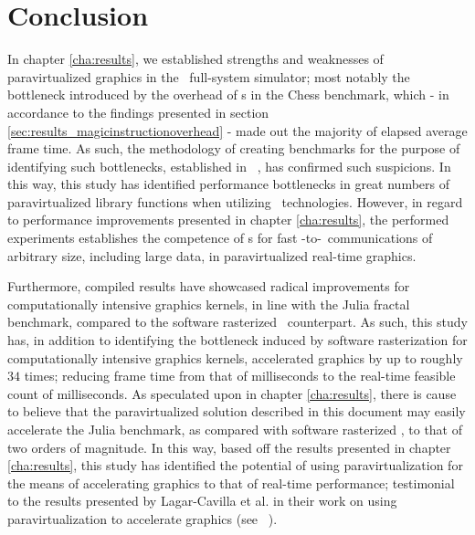 
\chapter{Conclusion}
\label{cha:conclusion}
In chapter \ref{cha:results}, we established strengths and weaknesses of paravirtualized graphics in the \dvttermsimics\ full-system simulator; most notably the bottleneck introduced by the overhead of \dvttermmagicinstruction s in the Chess benchmark, which - in accordance to the findings presented in section \ref{sec:results_magicinstructionoverhead} - made out the majority of elapsed average frame time.
As such, the methodology of creating benchmarks for the purpose of identifying such bottlenecks, established in ~, has confirmed such suspicions.
In this way, this study has identified performance bottlenecks in great numbers of paravirtualized library functions when utilizing \dvttermmagicinstruction\ technologies.
However, in regard to performance improvements presented in chapter \ref{cha:results}, the performed experiments establishes the competence of \dvttermmagicinstruction s for fast \dvttermtarget -to-\dvttermhost\ communications of arbitrary size, including large data, in paravirtualized real-time graphics.

Furthermore, compiled results have showcased radical improvements for computationally intensive graphics kernels, in line with the Julia fractal benchmark, compared to the software rasterized \dvttermsimics\ counterpart.
As such, this study has, in addition to identifying the bottleneck induced by software rasterization for computationally intensive graphics kernels, accelerated graphics by up to roughly $34$ times; reducing frame time from that of  milliseconds to the real-time feasible count of  milliseconds.
As speculated upon in chapter \ref{cha:results}, there is cause to believe that the paravirtualized solution described in this document may easily accelerate the Julia benchmark, as compared with software rasterized \dvttermsimics , to that of two orders of magnitude.
In this way, based off the results presented in chapter \ref{cha:results}, this study has identified the potential of using paravirtualization for the means of accelerating graphics to that of real-time performance; testimonial to the results presented by Lagar-Cavilla et al. in their work on using paravirtualization to accelerate graphics (see ~).

